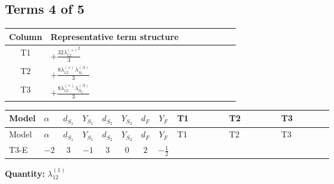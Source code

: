 \documentclass[8pt]{article}
\begin{document}
\begin{landscape}
\subsection*{Terms 4 of 5}
\begin{center}
\begin{tabular}{@{}c >{\raggedright\arraybackslash}p{0.82\linewidth}@{}}
\toprule
Column & Representative term structure \\
\midrule
T1 & \(\displaystyle +\frac{32 {\lambda_{12}^{(\times)}}^2}{3}\) \\
\midrule
T2 & \(\displaystyle +\frac{8 {\lambda_{12}^{(\times)}} {\lambda_{S_1}^{(A)}}}{3}\) \\
\midrule
T3 & \(\displaystyle +\frac{8 {\lambda_{12}^{(\times)}} {\lambda_{S_2}^{(A)}}}{3}\) \\
\midrule
\bottomrule
\end{tabular}
\end{center}
\smallskip
\tiny
\begin{longtable}{@{}llcccccc >{\raggedright\arraybackslash}p{0.21\linewidth} >{\raggedright\arraybackslash}p{0.21\linewidth} >{\raggedright\arraybackslash}p{0.21\linewidth}@{}}
\toprule
Model & $\alpha$ & $d_{S_1}$ & $Y_{S_1}$ & $d_{S_2}$ & $Y_{S_2}$ & $d_F$ & $Y_F$ & T1 & T2 & T3 \\
\midrule
\endfirsthead
\toprule
Model & $\alpha$ & $d_{S_1}$ & $Y_{S_1}$ & $d_{S_2}$ & $Y_{S_2}$ & $d_F$ & $Y_F$ & T1 & T2 & T3 \\
\midrule
\endhead
T3-E & $-2$ & $3$ & $-1$ & $3$ & $0$ & $2$ & $-\frac{1}{2}$ & \scriptsize\adjustbox{max width=\linewidth}{$\begin{gathered} +\frac{32 {\lambda_{12}^{(\times)}}^2}{3}\end{gathered}$} & \scriptsize\adjustbox{max width=\linewidth}{$\begin{gathered} +\frac{8 {\lambda_{12}^{(\times)}} {\lambda_{S_1}^{(A)}}}{3}\end{gathered}$} & \scriptsize\adjustbox{max width=\linewidth}{$\begin{gathered} +\frac{8 {\lambda_{12}^{(\times)}} {\lambda_{S_2}^{(A)}}}{3}\end{gathered}$} \\
\midrule
\bottomrule
\end{longtable}
\clearpage
\noindent\textbf{Quantity: }$\lambda_{12}^{(1)}$\par\smallskip

\end{landscape}
\end{document}
